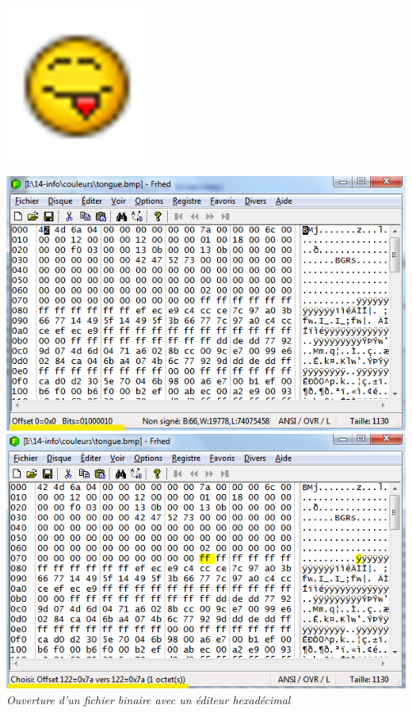 \documentclass[10pt,fleqn]{article} %
\begin{document}
\begin{minipage}[c]{.25\linewidth}
\begin{center}
\includegraphics[width=.5\textwidth]{images/image6.png}
\end{center}
\begin{center}
\includegraphics[width=.99\textwidth]{images/image12.png}
\includegraphics[width=.99\textwidth]{images/image13.png}
\textit{Ouverture d'un fichier binaire avec un éditeur hexadécimal}
\end{center}
\end{minipage}
\end{document}
